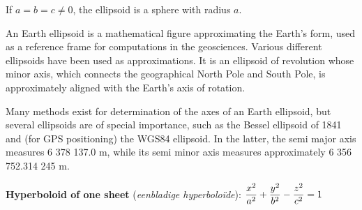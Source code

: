 If $a=b=c\neq0$, the ellipsoid is a sphere with radius $a$.

\begin{remark}
An Earth ellipsoid is a mathematical figure approximating the Earth's form, used as a reference frame for computations in the geosciences. Various different ellipsoids have been used as approximations. It is an ellipsoid of revolution whose minor axis, which connects the geographical North Pole and South Pole, is approximately aligned with the Earth's axis of rotation. 

Many methods exist for determination of the axes of an Earth ellipsoid, but several ellipsoids are of special importance, such as the Bessel ellipsoid of 1841 and (for GPS positioning) the WGS84 ellipsoid. In the latter, the semi major axis measures 6 378 137.0 m, while its semi minor axis measures approximately 6 356 752.314 245 m.
\end{remark}


\textbf{Hyperboloid of one sheet} (\textit{eenbladige hyperbolo\"ide}): \quad$\displaystyle \frac{x^2}{a^2}+\frac{y^2}{b^2}-\frac{z^2}{c^2}=1$

